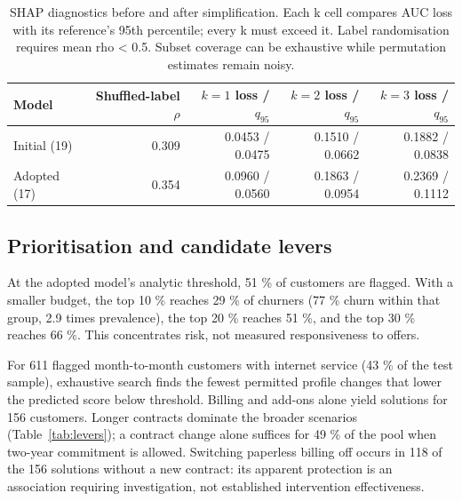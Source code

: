 \documentclass[10pt,a4paper]{article}
\begin{document}
\begin{table}[H]
\centering\small
\setlength{\tabcolsep}{4pt}
\begin{tabular*}{\linewidth}{@{\extracolsep{\fill}}lrrrr@{}}
\toprule
Model & \shortstack[r]{Shuffled-label\\$\rho$} & \shortstack[r]{$k=1$\\loss / $q_{95}$} & \shortstack[r]{$k=2$\\loss / $q_{95}$} & \shortstack[r]{$k=3$\\loss / $q_{95}$} \\
\midrule
Initial (19) & 0.309 & 0.0453 / 0.0475 & 0.1510 / 0.0662 & 0.1882 / 0.0838 \\
Adopted (17) & 0.354 & 0.0960 / 0.0560 & 0.1863 / 0.0954 & 0.2369 / 0.1112 \\
\bottomrule
\end{tabular*}
\caption{SHAP diagnostics before and after
simplification. Each k cell compares AUC loss with its reference's 95th
percentile; every k must exceed it. Label randomisation requires mean
rho \textless{} 0.5. Subset coverage can be exhaustive while permutation
estimates remain noisy.}
\label{tab:checks}
\end{table}

\subsection{Prioritisation and candidate
levers}\label{prioritisation-and-candidate-levers}

At the adopted model's analytic threshold, 51 \% of customers are
flagged. With a smaller budget, the top 10 \% reaches 29 \% of churners
(77 \% churn within that group, 2.9 times prevalence), the top 20 \%
reaches 51 \%, and the top 30 \% reaches 66 \%. This concentrates risk,
not measured responsiveness to offers.

For 611 flagged month-to-month customers with internet service (43 \% of
the test sample), exhaustive search finds the fewest permitted profile
changes that lower the predicted score below threshold. Billing and
add-ons alone yield solutions for 156 customers. Longer contracts
dominate the broader scenarios (Table~\ref{tab:levers}); a contract change alone
suffices for 49 \% of the pool when two-year commitment is allowed.
Switching paperless billing off occurs in 118 of the 156 solutions
without a new contract: its apparent protection is an association
requiring investigation, not established intervention effectiveness.
\end{document}
